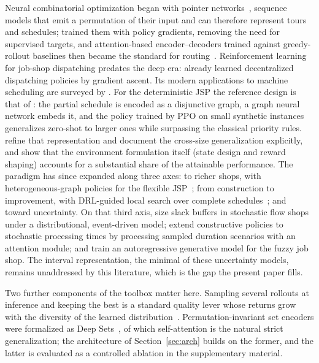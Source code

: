 \documentclass[preprint,12pt]{elsarticle}
\theoremstyle{definition}
\theoremstyle{remark}
\begin{document}
Neural combinatorial optimization began with pointer
networks~\citep{Vinyals2015}, sequence models that emit a permutation
of their input and can therefore represent tours and schedules;
\citet{Bello2016} trained them with policy gradients, removing the
need for supervised targets, and attention-based
encoder--decoders trained against greedy-rollout baselines then
became the standard for routing~\citep{Kool2019,Nazari2018}.
Reinforcement learning for job-shop dispatching predates the deep
era: \citet{Gabel2008} already learned decentralized dispatching
policies by gradient ascent. Its modern applications to machine
scheduling are surveyed by \citet{Kayhan2023}. For the deterministic
JSP the reference design is that of \citet{Zhang2020L2D}: the partial
schedule is encoded as a disjunctive graph, a graph neural network
embeds it, and the policy trained by PPO on small synthetic instances
generalizes zero-shot to larger ones while surpassing the classical
priority rules. \citet{Park2021GNN} refine that representation and
document the cross-size generalization explicitly, and
\citet{Tassel2021} show that the environment formulation
itself (state design and reward shaping) accounts for a substantial
share of the attainable performance. The paradigm has since expanded
along three axes: to richer shops, with heterogeneous-graph policies
for the flexible JSP~\citep{Song2023FJSP}; from construction to
improvement, with DRL-guided local search over complete
schedules~\citep{Zhang2024L2S}; and toward uncertainty. On that third
axis, \citet{Grumbach2024} size slack buffers in stochastic flow
shops under a distributional, event-driven model;
\citet{Smit2024Stochastic} extend constructive policies to stochastic
processing times by processing sampled duration scenarios with an
attention module; and \citet{Wang2025FuzzyAR} train an autoregressive
generative model for the fuzzy job shop. The interval
representation, the minimal of these uncertainty models, remains
unaddressed by this literature, which is the gap the present paper
fills.

Two further components of the toolbox matter here. Sampling several
rollouts at inference and keeping the best is a standard quality
lever whose returns grow with the diversity of the learned
distribution~\citep{Kool2019,Kwon2020}. Permutation-invariant set
encoders were formalized as Deep Sets~\citep{Zaheer2017}, of which
self-attention is the natural strict generalization; the architecture
of Section~\ref{sec:arch} builds on the former, and the latter is
evaluated as a controlled ablation in the supplementary material.
\end{document}
